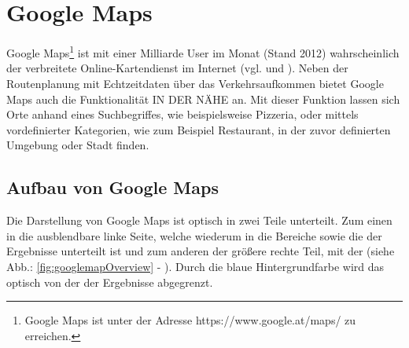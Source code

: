 \documentclass[../Bachelorarbeit.tex]{subfiles}
\begin{document}

\section{Google Maps}
\label{chap:analyse:sec:sota:sec:google_maps}
Google Maps\footnote{
	Google Maps ist unter der Adresse https://www.google.at/maps/ zu erreichen. 
} ist mit einer Milliarde User im Monat (Stand 2012) wahrscheinlich der verbreitete Online-Kartendienst im Internet (vgl. \cite{McClendonGoogleMapsBlog} und \cite{McClendonYoutube}).  
Neben der Routenplanung mit Echtzeitdaten über das Verkehrsaufkommen bietet Google Maps auch die Funktionalität IN DER NÄHE an.
Mit dieser Funktion lassen sich Orte anhand eines Suchbegriffes, wie beispielsweise Pizzeria, oder mittels vordefinierter Kategorien, wie zum Beispiel Restaurant, in der zuvor definierten Umgebung oder Stadt finden.


\subsection{Aufbau von Google Maps}
Die Darstellung von Google Maps ist optisch in zwei Teile unterteilt.
Zum einen in die ausblendbare linke Seite, welche wiederum in die Bereiche  sowie die  der Ergebnisse unterteilt ist und zum anderen der größere rechte Teil, mit der (siehe Abb.: \ref{fig:googlemapOverview} - ).
Durch die blaue Hintergrundfarbe wird das  optisch von der  der Ergebnisse abgegrenzt.
\end{document}
